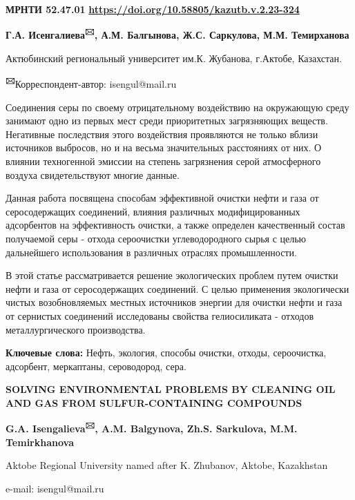 \newpage
{\bfseries МРНТИ 52.47.01}
\hfill {\bfseries \href{https://doi.org/10.58805/kazutb.v.2.23-324}{https://doi.org/10.58805/kazutb.v.2.23-324}}


\begin{center}
{\bfseries Г.А. Исенгалиева\textsuperscript{🖂}, А.М. Балгынова, Ж.С. Саркулова, М.М. Темирханова}

Актюбинский региональный университет им.К. Жубанова, г.Актобе,
Казахстан.

{\bfseries \textsuperscript{🖂}}Корреспондент-автор: isengul@mail.ru
\end{center}

Соединения серы по своему отрицательному воздействию на окружающую среду
занимают одно из первых мест среди приоритетных загрязняющих веществ.
Негативные последствия этого воздействия проявляются не только вблизи
источников выбросов, но и на весьма значительных расстояниях от них. О
влиянии техногенной эмиссии на степень загрязнения серой атмосферного
воздуха свидетельствуют многие данные.

Данная работа посвящена способам эффективной очистки нефти и газа от
серосодержащих соединений, влияния различных модифицированных
адсорбентов на эффективность очистки, а также определен качественный
состав получаемой серы - отхода сероочистки углеводородного сырья с
целью дальнейшего использования в различных отраслях промышленности.

В этой статье рассматривается решение экологических проблем путем
очистки нефти и газа от серосодержащих соединений. С целью применения
экологически чистых возобновляемых местных источников энергии для
очистки нефти и газа от сернистых соединений исследованы свойства
гелиосиликата - отходов металлургического производства.

{\bfseries Ключевые слова:} Нефть, экология, способы очистки, отходы,
сероочистка, адсорбент, меркаптаны, сероводород, сера.

\begin{center}
{\large\bfseries SOLVING ENVIRONMENTAL PROBLEMS BY CLEANING OIL AND GAS FROM SULFUR-CONTAINING COMPOUNDS}

{\bfseries G.A. Isengalieva\textsuperscript{🖂}, A.M. Balgynova, Zh.S. Sarkulova, M.M. Temirkhanova}

Aktobe Regional University named after K. Zhubanov, Aktobe, Kazakhstan

e-mail: isengul@mail.ru
\end{center}

